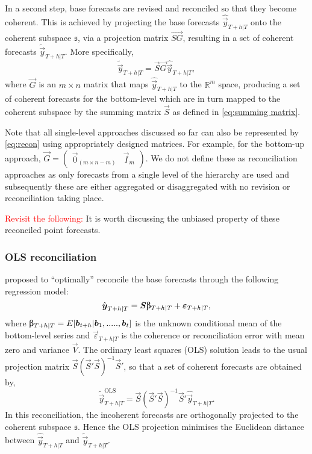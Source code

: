\documentclass[graybox]{svmult}
\begin{document}
In a second step, base forecasts are revised and reconciled so that they become coherent. This is achieved by projecting the base forecasts $\hat{\vec{y}}_{T+h|T}$ onto the coherent subspace $\mathfrak{s}$, via a projection matrix $\vec{SG}$, resulting in a set of coherent forecasts $\tilde{\vec{y}}_{T+h|T}$. More specifically,
\begin{equation}\label{eq:recon}
\tilde{\vec{y}}_{T+h|T}=\vec{S}\vec{G}\hat{\vec{y}}_{T+h|T},
\end{equation}
where $\vec{G}$ is an $m\times n$ matrix that maps $\hat{\vec{y}}_{T+h|T}$ to the $\mathbb{R}^m$ space, producing a set of coherent forecasts for the bottom-level which are in turn mapped to the coherent subspace by the summing matrix $\vec{S}$ as defined in \eqref{eq:summing matrix}.

Note that all single-level approaches discussed so far can also be represented by \eqref{eq:recon} using appropriately designed  matrices. For example, for the bottom-up approach, $\vec{G}=\begin{pmatrix}
\vec{0}_{(m \times n-m)} & \vec{I}_m
\end{pmatrix}$. We do not define these as reconciliation approaches as only forecasts from a single level of the hierarchy are used and subsequently these are either aggregated or disaggregated with no revision or reconciliation taking place.

\textcolor{red}{Revisit the following:}
It is worth discussing the unbiased property of these reconciled point forecasts.

\subsubsection{OLS reconciliation}

\cite{HynEtAl2011} proposed to ``optimally'' reconcile the base forecasts through the following regression model:
\begin{equation}\label{eq:OLS}
\hat{\vec{y}}_{T+h|T} = \vec{S\ubeta}_{T+h|T} + \vec{\varepsilon}_{T+h|T},
\end{equation}
where $\vec{\ubeta}_{T+h|T}=E[\vec{b}_{t+h}|\vec{b}_1,.....,\vec{b}_t]$ is the unknown conditional mean of the bottom-level series and $\vec{\varepsilon}_{T+h|T}$ is the coherence or reconciliation error with mean zero and variance $\vec{V}$. The ordinary least squares (OLS) solution leads to the usual projection matrix $\vec{S}(\vec{S}'\vec{S})^{-1}\vec{S}'$, so that a set of coherent forecasts are obtained by,
\begin{equation*}
\tilde{\vec{y}}_{T+h|T}^{\text{OLS}} = \vec{S}(\vec{S}'\vec{S})^{-1}\vec{S}'\hat{\vec{y}}_{T+h|T}.
\end{equation*}
In this reconciliation, the incoherent forecasts are orthogonally projected to the coherent subspace $\mathfrak{s}$. Hence the OLS projection minimises the Euclidean distance between $\hat{\vec{y}}_{T+h|T}$ and $\tilde{\vec{y}}_{T+h|T}$.
\end{document}
